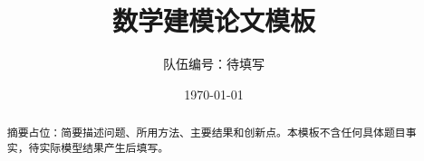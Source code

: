 \documentclass[12pt,a4paper]{ctexart}
\title{数学建模论文模板}
\author{队伍编号：待填写}
\date{\today}
\begin{document}
\maketitle

\begin{abstract}
\noindent 摘要占位：简要描述问题、所用方法、主要结果和创新点。本模板不含任何具体题目事实，待实际模型结果产生后填写。
\end{abstract}

\tableofcontents
\newpage













\end{document}
